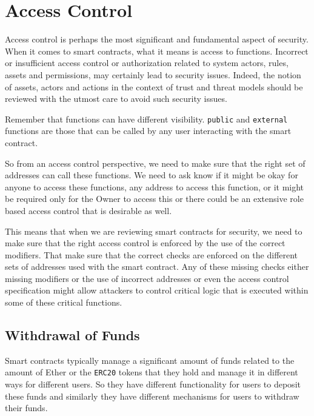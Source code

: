 \section{Access Control}\label{access-control}

Access control is perhaps the most significant and fundamental aspect of
security. When it comes to smart contracts, what it means is access to
functions. Incorrect or insufficient access control or authorization
related to system actors, rules, assets and permissions, may certainly
lead to security issues. Indeed, the notion of assets, actors and
actions in the context of trust and threat models should be reviewed
with the utmost care to avoid such security issues.

Remember that functions can have different visibility. \texttt{public}
and \texttt{external} functions are those that can be called by any user
interacting with the smart contract.

So from an access control perspective, we need to make sure that the
right set of addresses can call these functions. We need to ask know if
it might be okay for anyone to access these functions, any address to
access this function, or it might be required only for the Owner to
access this or there could be an extensive role based access control
that is desirable as well.

This means that when we are reviewing smart contracts for security, we
need to make sure that the right access control is enforced by the use
of the correct modifiers. That make sure that the correct checks are
enforced on the different sets of addresses used with the smart
contract. Any of these missing checks either missing modifiers or the
use of incorrect addresses or even the access control specification
might allow attackers to control critical logic that is executed within
some of these critical functions.

\subsection{Withdrawal of Funds}\label{withdrawal-of-funds}

Smart contracts typically manage a significant amount of funds related
to the amount of Ether or the \texttt{ERC20} tokens that they hold and
manage it in different ways for different users. So they have different
functionality for users to deposit these funds and similarly they have
different mechanisms for users to withdraw their funds.

